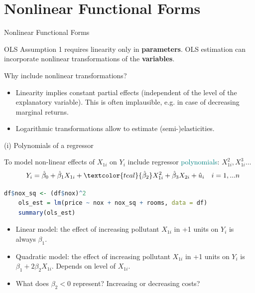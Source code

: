\documentclass[11pt, aspectratio = 169]{beamer}
\begin{document}
\section{Nonlinear Functional Forms}

\begin{frame}{Nonlinear Functional Forms}

OLS Assumption 1 requires linearity only in \color{teal}\textbf{parameters}\color{black}. OLS estimation can incorporate nonlinear transformations of the \color{teal}\textbf{variables}\color{black}.

\pause
Why include nonlinear transformations?
\begin{itemize}
    \item Linearity implies constant partial effects (independent of the level of the explanatory variable). This is often implausible, e.g. in case of decreasing marginal returns.

    \item Logarithmic transformations allow to estimate (semi-)elasticities.
\end{itemize}
\end{frame}


\begin{frame}[fragile]{(i) Polynomials of a regressor}

To model non-linear effects of $X_{1i}$ on $Y_i$ include regressor \textcolor{teal}{polynomials}: $X_{1i}^2, X_{1i}^3 \dots$
\[
\quad Y_i = \hat{\beta}_0 + \hat{\beta}_1 X_{1i} + \textcolor{teal}{\hat{\beta}_2} X_{1i}^2 + \hat{\beta}_3 X_{2i} + \hat{u}_{i} \quad i = 1, ... n
\]
\pause
\begin{lstlisting}[language=R]
    df$nox_sq <- (df$nox)^2
    ols_est = lm(price ~ nox + nox_sq + rooms, data = df)
    summary(ols_est)
\end{lstlisting}

\begin{itemize}
    \item Linear model: the effect of increasing pollutant $X_{1i}$ in \alert{+1} units on $Y_i$ is \alert{always} $\beta_1$.
    \pause
    \item Quadratic model: the effect of increasing pollutant $X_{1i}$ in \alert{+1} units on $Y_i$ is $\beta_1 + 2\beta_2 X_{1i}$. \pause Depends on \alert{level} of $X_{1i}$.
    \pause
    \item[$\rightarrow$] What does $\beta_2 < 0$ represent? Increasing or decreasing costs?
\end{itemize}

\end{frame}
\end{document}
